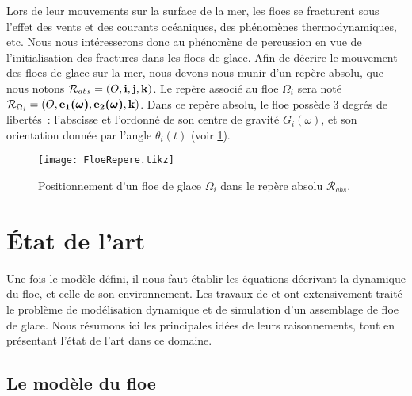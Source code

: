 

Lors de leur mouvements sur la surface de la mer, les floes se fracturent sous l'effet des vents et des courants océaniques, des phénomènes thermodynamiques, etc. Nous nous intéresserons donc au phénomène de percussion en vue de l'initialisation des fractures dans les floes de glace. Afin de décrire le mouvement des floes de glace sur la mer, nous devons nous munir d'un repère absolu, que nous notons $\mathcal{R}_{abs} = (O, \bm{\mathrm{i}}, \bm{\mathrm{j}}, \bm{\mathrm{k}})$. Le repère associé au floe $\Omega_i$ sera noté $\mathcal{R}_{\Omega_i} = (O, \bm {\bm{\mathrm{e}}_1(\omega)}, \bm{\mathrm{\bm{\mathrm{e}}_2(\omega)}}, \bm{\mathrm{k}})$. Dans ce repère absolu, le floe possède 3 degrés de libertés : l'abscisse et l'ordonné de son centre de gravité $G_i(\omega)$, et son orientation donnée par l'angle $\theta_i (t)$ (voir \cref{fig:FloeRepere}). 

\begin{figure}[!h]
    \centering
    \texttt{[image: FloeRepere.tikz]}
    \caption{Positionnement d'un floe de glace $\Omega_i$ dans le repère absolu $\mathcal{R}_{abs}$.}
    \label{fig:FloeRepere}
\end{figure}


\section{État de l'art}

Une fois le modèle défini, il nous faut établir les équations décrivant la dynamique du floe, et celle de son environnement. Les travaux de \cite{rabatel2015thesis} et \cite{balasoiu2020thesis} ont extensivement traité le problème de modélisation dynamique et de simulation d'un assemblage de floe de glace. Nous résumons ici les principales idées de leurs raisonnements, tout en présentant l'état de l'art dans ce domaine.

\subsection{Le modèle du floe}

